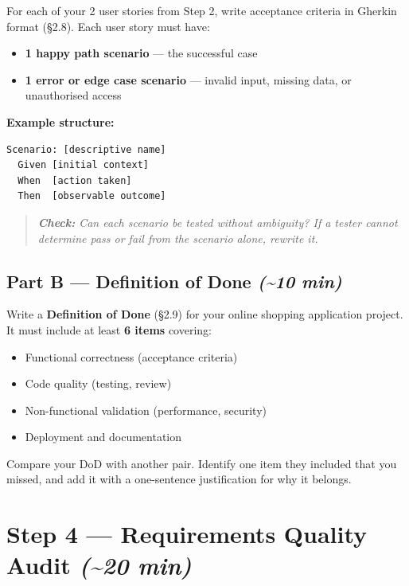 \documentclass[11pt,a4paper]{book}
\begin{document}
For each of your 2 user stories from Step 2, write acceptance criteria in Gherkin format (§2.8). Each user story must have:

\begin{itemize}
  \item \textbf{1 happy path scenario} --- the successful case
  \item \textbf{1 error or edge case scenario} --- invalid input, missing data, or unauthorised access
\end{itemize}

\textbf{Example structure:}

\begin{lstlisting}
Scenario: [descriptive name]
  Given [initial context]
  When  [action taken]
  Then  [observable outcome]
\end{lstlisting}

\begin{quote}
\textit{\textbf{Check:} Can each scenario be tested without ambiguity? If a tester cannot determine pass or fail from the scenario alone, rewrite it.}
\end{quote}

\subsection{Part B --- Definition of Done \textit{(\textasciitilde{}10 min)}}

Write a \textbf{Definition of Done} (§2.9) for your online shopping application project. It must include at least \textbf{6 items} covering:

\begin{itemize}
  \item Functional correctness (acceptance criteria)
  \item Code quality (testing, review)
  \item Non-functional validation (performance, security)
  \item Deployment and documentation
\end{itemize}

Compare your DoD with another pair. Identify one item they included that you missed, and add it with a one-sentence justification for why it belongs.

\medskip

\section{Step 4 --- Requirements Quality Audit \textit{(\textasciitilde{}20 min)}}
\end{document}
